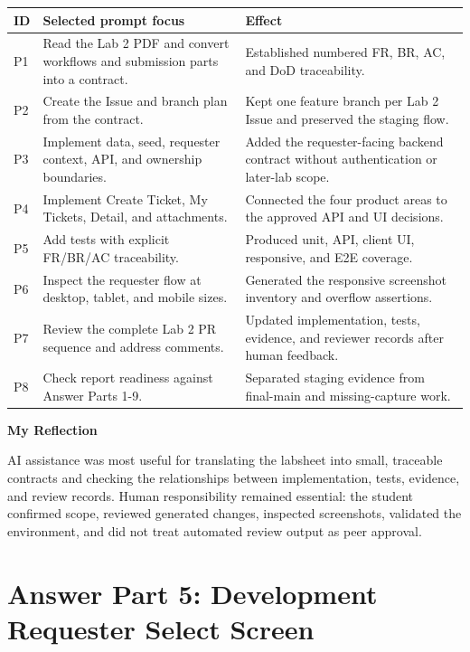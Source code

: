 \documentclass[10pt,a4paper]{article}
\begin{document}
\begin{center}
\small
\begin{longtable}{@{}p{9mm}p{65mm}p{77mm}@{}}
  \toprule
  ID & Selected prompt focus & Effect \\
  \midrule
  P1 & Read the Lab 2 PDF and convert workflows and submission parts into a contract. & Established numbered FR, BR, AC, and DoD traceability. \\
  P2 & Create the Issue and branch plan from the contract. & Kept one feature branch per Lab 2 Issue and preserved the staging flow. \\
  P3 & Implement data, seed, requester context, API, and ownership boundaries. & Added the requester-facing backend contract without authentication or later-lab scope. \\
  P4 & Implement Create Ticket, My Tickets, Detail, and attachments. & Connected the four product areas to the approved API and UI decisions. \\
  P5 & Add tests with explicit FR/BR/AC traceability. & Produced unit, API, client UI, responsive, and E2E coverage. \\
  P6 & Inspect the requester flow at desktop, tablet, and mobile sizes. & Generated the responsive screenshot inventory and overflow assertions. \\
  P7 & Review the complete Lab 2 PR sequence and address comments. & Updated implementation, tests, evidence, and reviewer records after human feedback. \\
  P8 & Check report readiness against Answer Parts 1-9. & Separated staging evidence from final-main and missing-capture work. \\
  \bottomrule
\end{longtable}
\end{center}

\textbf{My Reflection}

AI assistance was most useful for translating the labsheet into small,
traceable contracts and checking the relationships between implementation,
tests, evidence, and review records. Human responsibility remained essential:
the student confirmed scope, reviewed generated changes, inspected screenshots,
validated the environment, and did not treat automated review output as peer
approval.

\section{Answer Part 5: Development Requester Select Screen}
\end{document}
